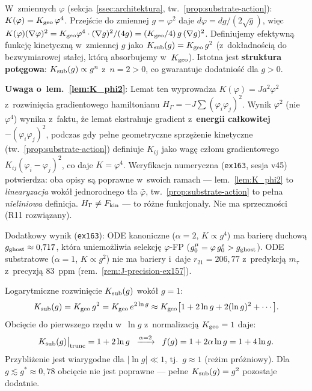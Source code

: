 \begin{remark}%
\label{rem:K-relation}
W~zmiennych $\varphi$ (sekcja~\ref{ssec:architektura},
tw.~\ref{prop:substrate-action}):
$K(\varphi) = K_{\rm geo}\,\varphi^4$.
Przejście do zmiennej $g = \varphi^2$
daje $d\varphi = dg/(2\sqrt{g})$, więc
$K(\varphi)(\nabla\varphi)^2 = K_{\rm geo}\varphi^4
  \cdot (\nabla g)^2/(4g) = (K_{\rm geo}/4)\,g\,(\nabla g)^2$.
Definiujemy efektywną funkcję kinetyczną
w~zmiennej $g$ jako $K_{\rm sub}(g) = K_{\rm geo}\,g^2$
(z~dokładnością do bezwymiarowej stałej, którą absorbujemy
w~$K_{\rm geo}$). Istotna jest \textbf{struktura potęgowa}:
$K_{\rm sub}(g) \propto g^n$ z~$n = 2 > 0$,
co gwarantuje dodatniość dla $g > 0$.

\smallskip\noindent
\textbf{Uwaga o~lem.~\ref{lem:K_phi2}}: Lemat ten wyprowadza
$K(\varphi) = J a^2 \varphi^2$ z~rozwinięcia gradientowego
hamiltonianu $H_\Gamma = -J\sum(\varphi_i\varphi_j)^2$.
Wynik $\varphi^2$ (nie $\varphi^4$) wynika z~faktu, że
lemat ekstrahuje gradient z~\textbf{energii całkowitej}
$-(\varphi_i\varphi_j)^2$, podczas gdy pełne geometryczne
sprzężenie kinetyczne (tw.~\ref{prop:substrate-action})
definiuje $K_{ij}$ jako wagę członu gradientowego
$K_{ij}(\varphi_i - \varphi_j)^2$, co daje $K = \varphi^4$.
Weryfikacja numeryczna (\texttt{ex163}, sesja v45) potwierdza:
oba opisy s\k{a} poprawne w~swoich ramach ---
lem.~\ref{lem:K_phi2} to \emph{linearyzacja} wok\'o\l{}
jednorodnego t\l{}a $\bar\varphi$,
tw.~\ref{prop:substrate-action} to pe\l{}na \emph{nieliniowa} definicja.
$H_\Gamma \neq F_{\rm kin}$ --- to r\'o\.zne funkcjona\l{}y.
Nie ma sprzeczno\'sci (R11 rozwi\k{a}zany).

Dodatkowy wynik (\texttt{ex163}): ODE kanoniczne ($\alpha = 2$,
$K \propto g^4$) ma barier\k{e} duchow\k{a} $g_{\rm ghost} \approx 0{,}717$,
kt\'ora uniemo\.zliwia selekcj\k{e} $\varphi$-FP
($g_0^\mu = \varphi\,g_0^e > g_{\rm ghost}$).
ODE substratowe ($\alpha = 1$, $K \propto g^2$) nie ma bariery
i~daje $r_{21} = 206{,}77$ z~predykcj\k{a} $m_\tau$ z~precyzj\k{a} $83$~ppm
(rem.~\ref{rem:J-precision-ex157}).
\end{remark}

\begin{remark}%
\label{rem:f-as-expansion}
Logarytmiczne rozwinięcie $K_{\rm sub}(g)$ wokół $g = 1$:
\begin{equation}\label{eq:Ksub-expansion}
  K_{\rm sub}(g) = K_{\rm geo}\,g^2
  = K_{\rm geo}\,e^{2\ln g}
  \approx K_{\rm geo}\bigl[1 + 2\ln g + 2(\ln g)^2 + \cdots\bigr].
\end{equation}
Obcięcie do pierwszego rzędu w~$\ln g$
z~normalizacją $K_{\rm geo} = 1$ daje:
\begin{equation}\label{eq:f-truncation}
  K_{\rm sub}(g)\big|_{\rm trunc}
  = 1 + 2\ln g
  \;\;\xrightarrow{\alpha=2}\;\;
  f(g) = 1 + 2\alpha\ln g = 1 + 4\ln g.
\end{equation}
Przybliżenie jest wiarygodne dla $|\ln g| \ll 1$,
tj.\ $g \approx 1$ (reżim próżniowy).
Dla $g \lesssim g^* \approx 0{,}78$
obcięcie nie jest poprawne --- pełne $K_{\rm sub}(g) = g^2$
pozostaje dodatnie.
\end{remark}


